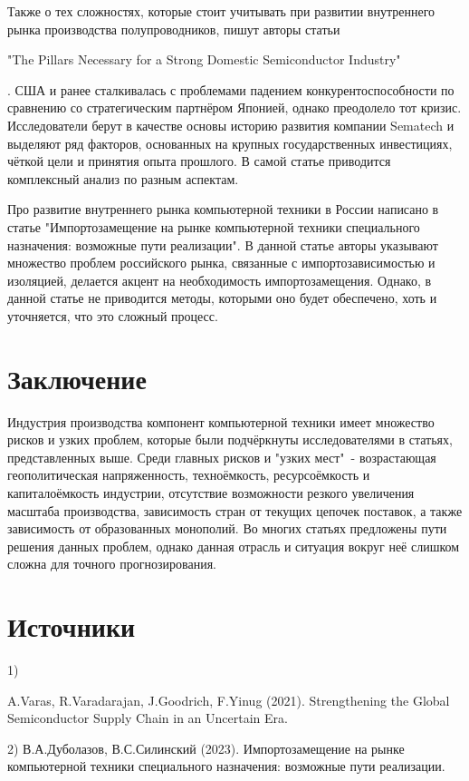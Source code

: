 \documentclass[14pt, a4paper]{extarticle}
\begin{document}
Также о тех сложностях, которые стоит учитывать при развитии внутреннего рынка производства полупроводников, пишут авторы статьи \begin{english} "The Pillars Necessary for a Strong Domestic Semiconductor Industry"\end{english}. США и ранее сталкивалась с проблемами падением конкурентоспособности по сравнению со стратегическим партнёром Японией, однако преодолело тот кризис. Исследователи берут в качестве основы историю развития компании Sematech и выделяют ряд факторов, основанных на крупных государственных инвестициях, чёткой цели и принятия опыта прошлого. В самой статье приводится комплексный анализ по разным аспектам. 

Про развитие внутреннего рынка компьютерной техники в России написано в статье "Импортозамещение на рынке
компьютерной техники специального назначения: возможные пути реализации". В данной статье авторы указывают множество проблем российского рынка, связанные с импортозависимостью и изоляцией, делается акцент на необходимость импортозамещения. Однако, в данной статье не приводится методы, которыми оно будет обеспечено, хоть и уточняется, что это сложный процесс. 

\newpage 
\section{Заключение}
Индустрия производства компонент компьютерной техники имеет множество рисков и узких проблем, которые были подчёркнуты исследователями в статьях, представленных выше. Среди главных рисков и "узких мест"\ - возрастающая геополитическая напряженность, техноёмкость, ресурсоёмкость и капиталоёмкость индустрии, отсутствие возможности резкого увеличения масштаба производства, зависимость стран от текущих цепочек поставок, а также зависимость от образованных монополий. Во многих статьях предложены пути решения данных проблем, однако данная отрасль и ситуация вокруг неё слишком сложна для точного прогнозирования. 

\newpage 
\section{Источники}
1) \begin{english} A.Varas, R.Varadarajan, J.Goodrich, F.Yinug (2021). Strengthening the Global Semiconductor Supply Chain in an Uncertain Era. \end{english}

2) В.А.Дуболазов, В.С.Силинский (2023). Импортозамещение на рынке компьютерной техники специального назначения: возможные пути реализации.
\end{document}
